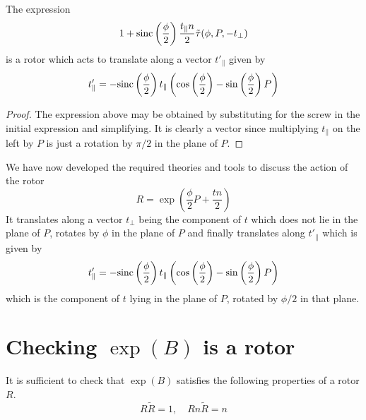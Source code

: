 \begin{lemma}
The expression
\[
 1 + \mathrm{sinc}\left(\frac{\phi}{2}\right)\frac{t_\parallel n}{2} \tilde{\tau}(\phi, P, - t_\perp)
\]
is a rotor which acts to translate along a vector $t'_\parallel$ given by
\[
t'_\parallel = - \mathrm{sinc}\left(\frac{\phi}{2}\right)
t_\parallel
\left(
\cos\left(\frac{\phi}{2}\right) -
\sin\left(\frac{\phi}{2}\right) P 
\right)
\]
\end{lemma}
\begin{proof}
The expression above may be obtained by substituting for the screw in the initial expression and simplifying. 
It is clearly a vector since multiplying $t_\parallel$ on the left by $P$ is just a rotation by $\pi / 2$ in the plane
of $P$.
\end{proof}

We have now developed the required theories and tools to discuss the
action of the rotor
\[
R = \exp\left(
\frac{\phi}{2} P + \frac{tn}{2}
\right)
\]
It translates along a vector $t_\perp$ being the component of $t$ which does not lie in the
plane of $P$, rotates by $\phi$ in the plane of $P$ and finally translates along 
$t'_\parallel$ which is given by
\[
t'_\parallel =- \mathrm{sinc}\left(\frac{\phi}{2}\right)
t_\parallel
\left(
\cos\left(\frac{\phi}{2}\right) -
\sin\left(\frac{\phi}{2}\right) P 
\right)
\]
which is the component of $t$ lying in the
plane of $P$, rotated by $\phi/2$ in that plane.

\section{Checking $\exp(B)$ is a rotor}

It is sufficient to check that $\exp(B)$ satisfies the following
properties of a rotor $R$. %
\[
R\tilde{R} = 1, \quad Rn\tilde{R} = n
\]

